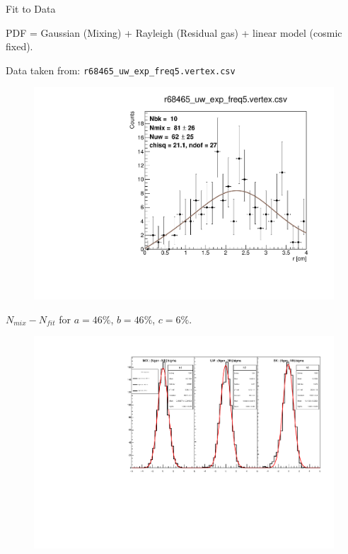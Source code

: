 \documentclass[9pt]{beamer}
\newcommand{\nologo}{\setbeamertemplate{logo}{}}
\begin{document}
\begin{frame}{Fit to Data}

PDF = Gaussian (Mixing) + Rayleigh (Residual gas) + linear model (cosmic fixed).

Data taken from: \texttt{r68465\_uw\_exp\_freq5.vertex.csv}
\begin{figure}
\centering
\includegraphics[width = 0.65 \textwidth]{./SingleModel/AnalyFit_2.pdf}
\end{figure}
\end{frame}


\begin{frame}[noframenumbering]
\begin{center}
\end{center}
\end{frame}

{\nologo
\begin{frame}{$N_{mix} - N_{fit}$ for $a = 46\%$, $b = 46\%$, $c = 6\%$.}
\begin{figure}
\includegraphics[width = 1\textwidth]{N165/ToyNmix(46,46,6).pdf}
\end{figure}
\end{frame}
}
\end{document}
